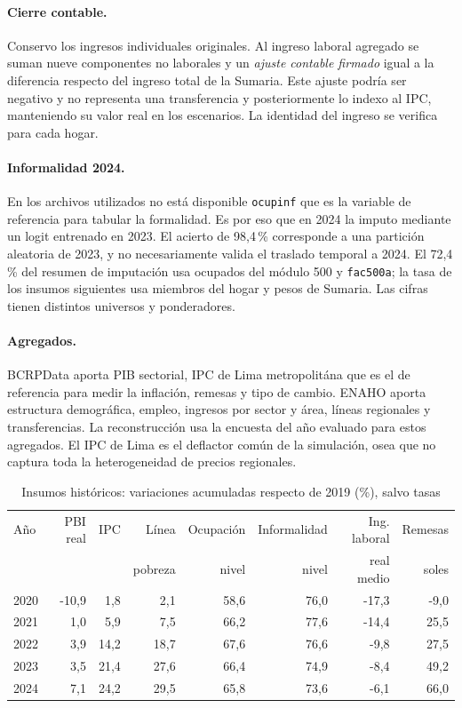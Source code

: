 \documentclass[11pt,a4paper]{article}
\begin{document}
\paragraph{Cierre contable.} Conservo los ingresos individuales originales. Al ingreso laboral agregado se suman nueve componentes no laborales y un \emph{ajuste contable firmado} igual a la diferencia respecto del ingreso total de la Sumaria. Este ajuste podría ser negativo y no representa una transferencia y posteriormente lo indexo al IPC, manteniendo su valor real en los escenarios. La identidad del ingreso se verifica para cada hogar.

\paragraph{Informalidad 2024.} En los archivos utilizados no está disponible \texttt{ocupinf} que es la variable de referencia para tabular la formalidad. Es por eso que en 2024 la imputo mediante un logit entrenado en 2023. El acierto de 98,4\,\% corresponde a una partición aleatoria de 2023, y no necesariamente valida el traslado temporal a 2024. El 72,4\,\% del resumen de imputación usa ocupados del módulo 500 y \texttt{fac500a}; la tasa de los insumos siguientes usa miembros del hogar y pesos de Sumaria. Las cifras tienen distintos universos y ponderadores.

\paragraph{Agregados.} BCRPData aporta PIB sectorial, IPC de Lima metropolitána que es el de referencia para medir la inflación, remesas y tipo de cambio. ENAHO aporta estructura demográfica, empleo, ingresos por sector y área, líneas regionales y transferencias. La reconstrucción usa la encuesta del año evaluado para estos agregados. El IPC de Lima es el deflactor común de la simulación, osea que no captura toda la heterogeneidad de precios regionales.

\begin{table}[ht]\centering\footnotesize
\caption{Insumos históricos: variaciones acumuladas respecto de 2019 (\%), salvo tasas}
\begin{tabular}{lrrrrrrr}\toprule
Año & PBI real & IPC & Línea & Ocupación & Informalidad & Ing. laboral & Remesas\\
 & & & pobreza & nivel & nivel & real medio & soles\\\midrule
2020 & -10,9 & 1,8 & 2,1 & 58,6 & 76,0 & -17,3 & -9,0 \\
2021 & 1,0 & 5,9 & 7,5 & 66,2 & 77,6 & -14,4 & 25,5 \\
2022 & 3,9 & 14,2 & 18,7 & 67,6 & 76,6 & -9,8 & 27,5 \\
2023 & 3,5 & 21,4 & 27,6 & 66,4 & 74,9 & -8,4 & 49,2 \\
2024 & 7,1 & 24,2 & 29,5 & 65,8 & 73,6 & -6,1 & 66,0 \\
\bottomrule\end{tabular}
\end{table}
\end{document}
